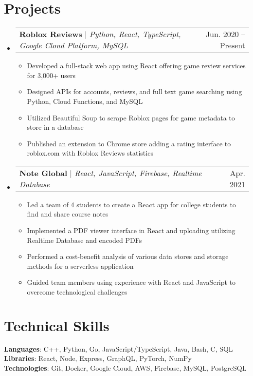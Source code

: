 \documentclass[letterpaper,11pt]{article}
\makeatletter
\newcommand{\resumeItem}[1]{
  \item\small{
    {#1 \vspace{-2pt}}
  }
}
\newcommand{\resumeProjectHeading}[2]{
    \item
    \begin{tabular*}{0.97\textwidth}{l@{\extracolsep{\fill}}r}
      \small#1 & #2 \\
    \end{tabular*}\vspace{-7pt}
}
\newcommand{\resumeSubHeadingListStart}{\begin{itemize}[leftmargin=0.15in, label={}]}
\newcommand{\resumeSubHeadingListEnd}{\end{itemize}}
\newcommand{\resumeItemListStart}{\begin{itemize}}
\newcommand{\resumeItemListEnd}{\end{itemize}\vspace{-5pt}}
\makeatother
\begin{document}
\section{Projects}
    \resumeSubHeadingListStart
      \resumeProjectHeading
          {\textbf{Roblox Reviews} $|$ \emph{Python, React, TypeScript, Google Cloud Platform, MySQL}}{Jun. 2020 -- Present}
          \resumeItemListStart
            \resumeItem{Developed a full-stack web app using React offering game review services for 3,000+ users}
            \resumeItem{Designed APIs for accounts, reviews, and full text game searching using Python, Cloud Functions, and MySQL}
            \resumeItem{Utilized Beautiful Soup to scrape Roblox pages for game metadata to store in a database}
            \resumeItem{Published an extension to Chrome store adding a rating
            interface to roblox.com with Roblox Reviews statistics}

          \resumeItemListEnd
      \resumeProjectHeading
          {\textbf{Note Global} $|$ \emph{React, JavaScript, Firebase, Realtime Database}}{Apr. 2021}
          \resumeItemListStart
            \resumeItem{Led a team of 4 students to create a React app for college students to find and share course notes}
            \resumeItem{Implemented a PDF viewer interface in React and uploading utilizing Realtime Database and encoded PDFs}
            \resumeItem{Performed a cost-benefit analysis of various data stores and storage methods for a serverless application}
            \resumeItem{Guided team members using experience with React and JavaScript to overcome technological challenges}
          \resumeItemListEnd
    \resumeSubHeadingListEnd



%
\section{Technical Skills}
 \begin{itemize}[leftmargin=0.15in, label={}]
    \small{\item{
     \textbf{Languages}{: C++, Python, Go, JavaScript/TypeScript, Java, Bash, C, SQL} \\
     \textbf{Libraries}{: React, Node, Express, GraphQL, PyTorch, NumPy} \\
     \textbf{Technologies}{: Git, Docker, Google Cloud, AWS, Firebase, MySQL, PostgreSQL}
    }}
 \end{itemize}


\end{document}
